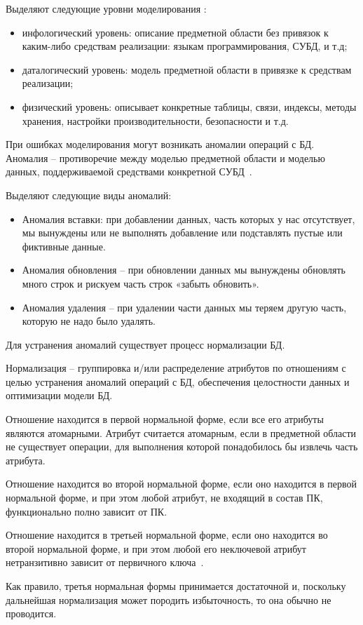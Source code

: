 Выделяют следующие уровни моделирования \cite{kulikov_db_workbook}:
\begin{itemize}
	\item инфологический уровень: описание предметной области без привязок к каким-либо средствам реализации: языкам программирования, СУБД, и т.д;
	\item даталогический уровень: модель предметной области в привязке к сре\-д\-с\-т\-вам реализации;
	\item физический уровень: описывает конкретные таблицы, связи, индексы, методы хранения, настройки производительности, безопасности и т.д.
\end{itemize}

При ошибках моделирования могут возникать аномалии операций с БД. Аномалия -- противоречие между моделью предметной области и моделью данных, поддерживаемой средствами конкретной СУБД~\cite{kulikov_db_workbook}.

Выделяют следующие виды аномалий:
\begin{itemize}
	\item Аномалия вставки: при добавлении данных, часть которых у нас отсутствует, мы вынуждены или не выполнять добавление или подставлять пустые или фиктивные данные.
	\item Аномалия обновления – при обновлении данных мы вынуждены обновлять много строк и рискуем часть строк «забыть обновить».
	\item Аномалия удаления – при удалении части данных мы теряем другую часть, которую не надо было удалять.
\end{itemize}

Для устранения аномалий существует процесс нормализации БД.

Нормализация -- группировка и/или распределение атрибутов по отношениям с целью устранения аномалий операций с БД, обеспечения целостности данных и оптимизации модели БД.

Отношение находится в первой нормальной форме, если все его атрибуты являются атомарными. Атрибут считается атомарным, если в предметной области не существует операции, для выполнения которой понадобилось бы извлечь часть атрибута.

Отношение находится во второй нормальной форме, если оно находится в первой нормальной форме, и при этом  любой атрибут, не входящий в состав ПК, функционально полно зависит от ПК.

Отношение находится в третьей нормальной форме, если оно находится во второй нормальной форме, и при этом любой его неключевой атрибут нетранзитивно зависит от первичного ключа~\cite{kulikov_db_workbook}.

Как правило, третья нормальная формы принимается достаточной и, поскольку дальнейшая нормализация может породить избыточность, то она обычно не проводится.
